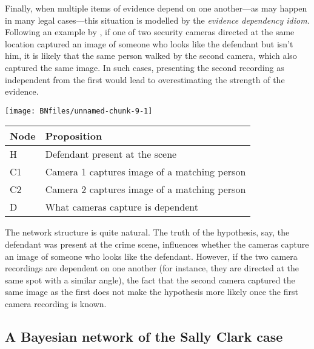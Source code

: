 \documentclass{article}
\begin{document}
Finally, when multiple items of evidence depend on one another---as may happen in many legal cases---this situation is modelled by the \textit{evidence dependency idiom}. Following an example by \cite{Fenton2018Risk}, if one of two security cameras directed at the same location captured an image of someone who looks like the defendant but isn't him, it is likely that the same person walked by the second camera, which also captured the same image. In such cases, presenting the second recording as independent from the first would lead to overestimating the strength of the evidence.   %

\begin{center}\texttt{[image: BNfiles/unnamed-chunk-9-1]} \end{center}


\begin{center}
\begin{tabular}{@{}lp{7.5cm}@{}}
\toprule
Node &  Proposition\\
\midrule
H &  Defendant present at the scene \\
C1 & Camera 1 captures image of a matching person \\
C2 & Camera 2 captures image of a matching person\\
D &  What cameras capture is dependent \\
\bottomrule
\end{tabular}
\end{center}


\noindent The network structure is quite natural. The truth of the hypothesis, say, the defendant was present at the crime scene, influences whether the cameras capture an image of someone who looks like the defendant. However, if the two camera recordings are dependent on one another (for instance, they are directed at the same spot with a similar angle), the fact that the second camera captured the same image as the first does not make the hypothesis more likely once the first camera recording is known.




 




 
 







\subsection{A Bayesian network of the Sally Clark case}\label{subsec:completeBN}
\end{document}
